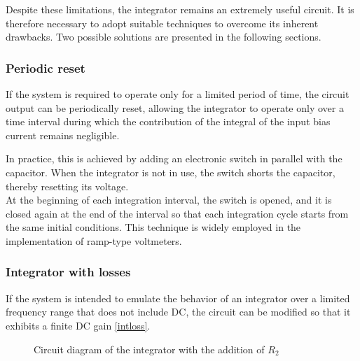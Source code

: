 \documentclass[../main.tex]{subfiles}
\begin{document}
Despite these limitations, the integrator remains an extremely useful circuit. It is therefore necessary to adopt suitable techniques to overcome its inherent drawbacks. Two possible solutions are presented in the following sections.\\


\subsubsection*{Periodic reset}

If the system is required to operate only for a limited period of time, the circuit output can be periodically reset, allowing the integrator to operate only over a time interval during which the contribution of the integral of the input bias current remains negligible. 

In practice, this is achieved by adding an electronic switch in parallel with the capacitor. When the integrator is not in use, the switch shorts the capacitor, thereby resetting its voltage.\\

At the beginning of each integration interval, the switch is opened, and it is closed again at the end of the interval so that each integration cycle starts from the same initial conditions. This technique is widely employed in the implementation of ramp-type voltmeters.\\


\subsubsection*{Integrator with losses}

If the system is intended to emulate the behavior of an integrator over a limited frequency range that does not include DC, the circuit can be modified so that it exhibits a finite DC gain \autoref{intloss}.

\begin{figure}[h!]
\begin{center}


\label{intloss}
\caption{Circuit diagram of the integrator with the addition of $R_2$}	
\end{center}	
\end{figure}
\end{document}
